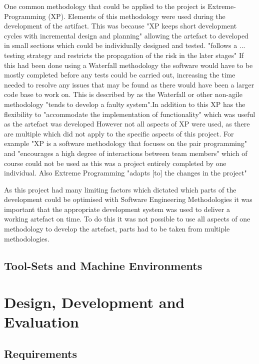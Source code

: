 \documentclass[11pt,a4paper]{report}
\begin{document}
One common methodology that could be applied to the project is Extreme-Programming (XP). Elements of this methodology were used during the development of the artifact. This was because "XP keeps short development cycles with incremental design and planning" \citep{XPsharma2016analysis} allowing the artefact to developed in small sections which could be individually designed and tested. "follows a ... testing strategy and restricts the propagation of the risk in the later stages" \citep{XPsharma2016analysis} If this had been done using a Waterfall methodology the software would have to be mostly completed before any tests could be carried out, increasing the time needed to resolve any issues that may be found as there would have been a larger code base to work on. This is described by \cite{XPsharma2016analysis} as the Waterfall or other non-agile methodology "tends to develop a faulty system".In addition to this XP has the flexibility to "accommodate the implementation of functionality" \citep{XPsharma2016analysis} which was useful as the artefact was developed However not all aspects of XP were used, as there are multiple which did not apply to the specific aspects of this project. For example "XP is a software methodology that focuses on the pair programming" and "encourages a high degree of interactions between team members" \citep{XPsharma2016analysis} which of course could not be used as this was a project entirely completed by one individual. Also Extreme Programming "adapts [to] the changes in the project"

As this project had many limiting factors which dictated which parts of the development could be optimised with Software Engineering Methodologies it was important that the appropriate development system was used to deliver a working artefact on time. To do this it was not possible to use all aspects of one methodology to develop the artefact, parts had to be taken from multiple methodologies.

\section{Tool-Sets and Machine Environments}

\chapter{Design, Development and Evaluation}

\section{Requirements}
\end{document}
